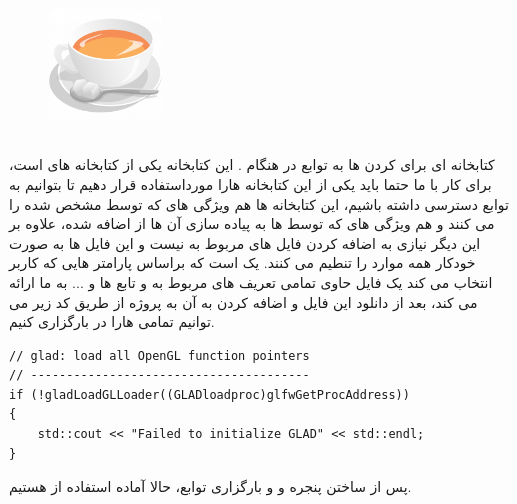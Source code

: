 \documentclass[a4paper, 12pt]{book}
\newcommand{\lrit}[1]{\lr{\textit{#1}}}
\begin{document}
\begin{figure}[ht]
    \centering
    \href{https://github.com/glfw}{
        \includegraphics[width=3cm]{GLFW.png}
    }
    \caption{}
    \label{fig:my_label}
\end{figure}

\newpage
\subsection*{}
\noindent
\normalsize
    کتابخانه ای برای \lrit{load} کردن  ها به توابع  در هنگام .
    این کتابخانه یکی از کتابخانه های است، برای کار با  ما حتما باید یکی از این کتابخانه هارا مورداستفاده قرار دهیم تا بتوانیم به توابع  دسترسی داشته باشیم، این کتابخانه ها هم ویژگی های  که توسط  مشخص شده را  می کنند و هم ویژگی های  که توسط  ها به پیاده سازی آن ها از  اضافه شده، علاوه بر این دیگر نیازی به اضافه کردن فایل های مربوط به  نیست و این فایل ها به صورت خودکار همه موارد را تنطیم می کنند.
     یک  است که براساس پارامتر هایی که کاربر انتخاب می کند یک فایل حاوی تمامی تعریف های مربوط به  و تابع ها و ... به ما ارائه می کند، بعد از دانلود این فایل و اضافه کردن به آن به پروژه از طریق کد زیر می توانیم تمامی  هارا در  بارگزاری کنیم.

    \begin{LTR}
        \small
        \begin{lstlisting}[style=C++Style,caption=\lrit{load opengl function pointer}]
// glad: load all OpenGL function pointers
// ---------------------------------------
if (!gladLoadGLLoader((GLADloadproc)glfwGetProcAddress))
{
    std::cout << "Failed to initialize GLAD" << std::endl;
}
        \end{lstlisting}
    \end{LTR}
    \normalsize
    \vspace*{0.3cm}
    پس از ساختن پنجره و  و بارگزاری توابع، حالا آماده استفاده از  هستیم.

\end{document}
